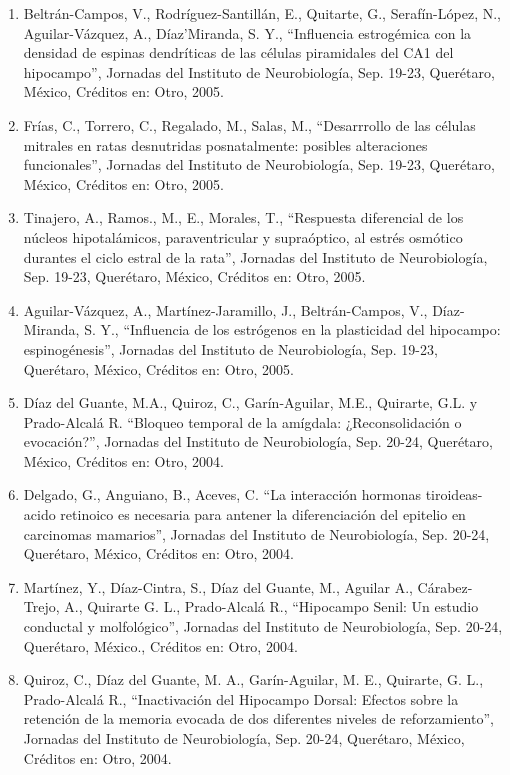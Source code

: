 \begin{enumerate}
\item Beltrán-Campos, V., Rodríguez-Santillán, E., Quitarte, G., Serafín-López, N., Aguilar-Vázquez, A., Díaz’Miranda, S. Y., “Influencia 
estrogémica con la densidad de espinas dendríticas de las células piramidales del CA1 del hipocampo”, Jornadas del Instituto de 
Neurobiología, Sep. 19-23, Querétaro, México, Créditos en: Otro, 2005.

\item Frías, C., Torrero, C., Regalado, M., Salas, M., “Desarrrollo de las células mitrales en ratas desnutridas posnatalmente: posibles 
alteraciones funcionales”, Jornadas del Instituto de Neurobiología, Sep. 19-23, Querétaro, México, Créditos en: Otro, 2005.

\item Tinajero, A., Ramos., M., E., Morales, T., “Respuesta diferencial de los núcleos hipotalámicos, paraventricular y supraóptico, al 
estrés 
osmótico durantes el ciclo estral de la rata”, Jornadas del Instituto de Neurobiología, Sep. 19-23, Querétaro, México, Créditos en: Otro, 
2005.

\item Aguilar-Vázquez, A., Martínez-Jaramillo, J., Beltrán-Campos, V., Díaz-Miranda, S. Y., “Influencia de los estrógenos en la plasticidad 
del 
hipocampo: espinogénesis”, Jornadas del Instituto de Neurobiología, Sep. 19-23, Querétaro, México, Créditos en: Otro, 2005.

\item Díaz del Guante, M.A., Quiroz, C., Garín-Aguilar, M.E., Quirarte, G.L. y Prado-Alcalá R. “Bloqueo temporal de la amígdala: 
¿Reconsolidación o 
evocación?”, Jornadas del Instituto de Neurobiología, Sep. 20-24, Querétaro, México, Créditos en: Otro, 2004.

\item Delgado, G., Anguiano, B., Aceves, C. “La interacción hormonas tiroideas-acido retinoico es necesaria para antener la diferenciación 
del 
epitelio en carcinomas mamarios”, Jornadas del Instituto de Neurobiología, Sep. 20-24, Querétaro, México, Créditos en: Otro, 2004.

\item Martínez, Y., Díaz-Cintra, S., Díaz del Guante, M., Aguilar A., Cárabez-Trejo, A., Quirarte G. L., Prado-Alcalá R., “Hipocampo Senil: 
Un 
estudio conductal y molfológico”, Jornadas del Instituto de Neurobiología, Sep. 20-24, Querétaro, México., Créditos en: Otro, 2004.

\item Quiroz, C., Díaz del Guante, M. A., Garín-Aguilar, M. E., Quirarte, G. L., Prado-Alcalá R., “Inactivación del Hipocampo Dorsal: Efectos 
sobre 
la retención de la memoria evocada de dos diferentes niveles de reforzamiento”, Jornadas del Instituto de Neurobiología, Sep. 20-24, 
Querétaro, México, Créditos en: Otro, 2004.


\end{enumerate}
